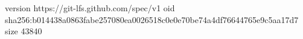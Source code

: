version https://git-lfs.github.com/spec/v1
oid sha256:b014438a0863fabe257080ea0026518c0e0e70be74a4df76644765e9c5aa17d7
size 43840
